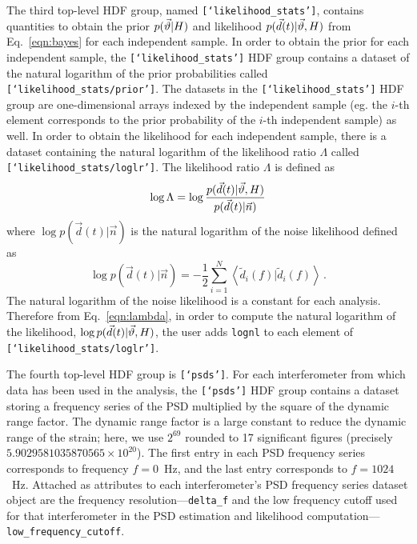 The third top-level HDF group, named \texttt{[`likelihood\_stats']}, contains quantities to obtain the prior $p(\vec{\vartheta}|H)$ and likelihood $p(\vec{d}(t)|\vec{\vartheta},H)$ from Eq.~\ref{eqn:bayes} for each independent sample.
In order to obtain the prior for each independent sample, the \texttt{[`likelihood\_stats']} HDF group contains a dataset of the natural logarithm of the prior probabilities called \texttt{[`likelihood\_stats/prior']}. The datasets in the \texttt{[`likelihood\_stats']} HDF group are one-dimensional arrays indexed by the independent sample (eg. the $i$-th element corresponds to the prior probability of the $i$-th independent sample) as well. In order to obtain the likelihood for each independent sample, there is a dataset containing the natural logarithm of the likelihood ratio $\Lambda$ called \texttt{[`likelihood\_stats/loglr']}. The likelihood ratio $\Lambda$ is defined as~\cite{Biwer:2018osg}
\begin{equation}\label{eqn:lambda}
\log \Lambda = \log \frac{p(\vec{d}(t)|\vec{\vartheta},H)}{p(\vec{d}(t)|\vec{n})}
\end{equation}
where $\log p(\vec{d}(t)|\vec{n})$ is the natural logarithm of the noise likelihood defined as~\cite{Biwer:2018osg}
\begin{equation}\label{eqn:noise_likelihood}
\log p(\vec{d}(t)|\vec{n}) = - \frac{1}{2} \sum_{i=1}^{N} \left< \tilde{d}_{i}(f) | \tilde{d}_{i}(f) \right> \,.
\end{equation}
The natural logarithm of the noise likelihood is a constant for each analysis. Therefore from Eq.~\ref{eqn:lambda}, in order to compute the natural logarithm of the likelihood, $\log p(\vec{d}(t)|\vec{\vartheta},H)$, the user adds \texttt{lognl} to each element of \texttt{[`likelihood\_stats/loglr']}.

The fourth top-level HDF group is \texttt{[`psds']}. For each interferometer from which data has been used in the analysis, the \texttt{[`psds']} HDF group contains a dataset storing a frequency series of the PSD multiplied by the square of the dynamic range factor. The dynamic range factor is a large constant to reduce the dynamic range of the strain; here, we use $2^{69}$ rounded to 17 significant figures (precisely $5.9029581035870565\times 10^{20}$). The first entry in each PSD frequency series corresponds to frequency $f = 0$~Hz, and the last entry corresponds to $f = 1024$~Hz. Attached as attributes to each interferometer's PSD frequency series dataset object are the frequency resolution---\texttt{delta\_f} and the low frequency cutoff used for that interferometer in the PSD estimation and likelihood computation---\texttt{low\_frequency\_cutoff}.

